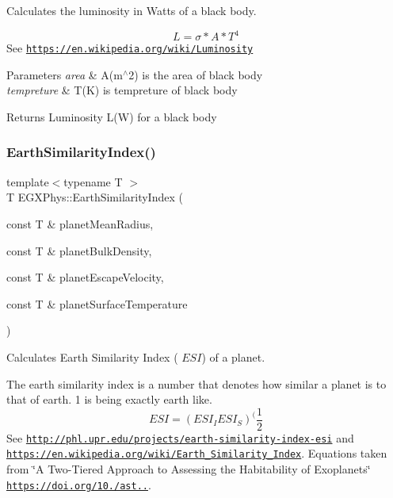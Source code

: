 Calculates the luminosity in Watts of a black body. 

\[L=\sigma*A*T^4\] See \href{https://en.wikipedia.org/wiki/Luminosity}{\tt https\+://en.\+wikipedia.\+org/wiki/\+Luminosity}


\begin{DoxyParams}{Parameters}
{\em area} & A(m$^\wedge$2) is the area of black body \\
\hline
{\em tempreture} & T(\+K) is tempreture of black body \\
\hline
\end{DoxyParams}
\begin{DoxyReturn}{Returns}
Luminosity L(\+W) for a black body 
\end{DoxyReturn}
\mbox{\label{group___astrophysics_ga4b86397b1c839c49ac599d49fda207d4}} 
\subsubsection{\texorpdfstring{Earth\+Similarity\+Index()}{EarthSimilarityIndex()}}
{\footnotesize\ttfamily template$<$typename T $>$ \\
T E\+G\+X\+Phys\+::\+Earth\+Similarity\+Index (\begin{DoxyParamCaption}\item[{const T \&}]{planet\+Mean\+Radius,  }\item[{const T \&}]{planet\+Bulk\+Density,  }\item[{const T \&}]{planet\+Escape\+Velocity,  }\item[{const T \&}]{planet\+Surface\+Temperature }\end{DoxyParamCaption})}



Calculates Earth Similarity Index ( $ESI$) of a planet. 

The earth similarity index is a number that denotes how similar a planet is to that of earth. 1 is being exactly earth like. \[ESI=(ESI_I ESI_S)^(\frac{1}{2}\] See \href{http://phl.upr.edu/projects/earth-similarity-index-esi}{\tt http\+://phl.\+upr.\+edu/projects/earth-\/similarity-\/index-\/esi} and \href{https://en.wikipedia.org/wiki/Earth_Similarity_Index}{\tt https\+://en.\+wikipedia.\+org/wiki/\+Earth\+\_\+\+Similarity\+\_\+\+Index}. Equations taken from \char`\"{}\+A Two-\/\+Tiered Approach to Assessing the Habitability of Exoplanets\char`\"{} \href{https://doi.org/10.1089/ast.2010.0592}{\tt https\+://doi.\+org/10./ast..}.


